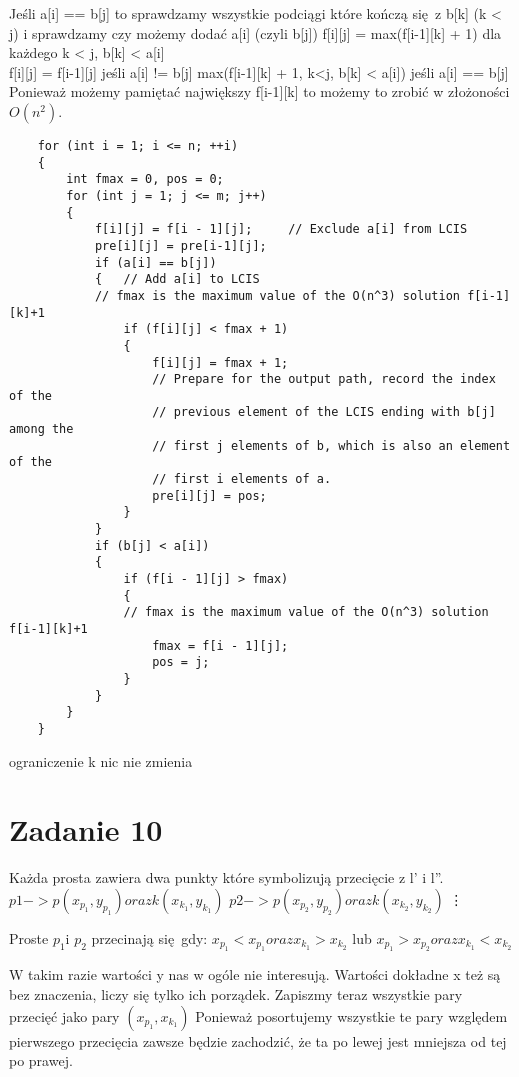 \documentclass[12pt]{article}
\begin{document}
Jeśli a[i] == b[j] to sprawdzamy wszystkie podciągi które kończą się z b[k] (k < j) i sprawdzamy czy możemy dodać a[i] (czyli b[j])
f[i][j] = max(f[i-1][k] + 1) dla każdego k < j, b[k] < a[i]\\


f[i][j] = f[i-1][j] jeśli a[i] != b[j]
max(f[i-1][k] + 1, k<j, b[k] < a[i]) jeśli a[i] == b[j]\\

Ponieważ możemy pamiętać największy f[i-1][k] to możemy to zrobić w złożoności $O(n^2)$.\\

\begin{lstlisting}
    for (int i = 1; i <= n; ++i)
    {
        int fmax = 0, pos = 0;
        for (int j = 1; j <= m; j++)
        {
            f[i][j] = f[i - 1][j];     // Exclude a[i] from LCIS
            pre[i][j] = pre[i-1][j];
            if (a[i] == b[j])
            {   // Add a[i] to LCIS
            // fmax is the maximum value of the O(n^3) solution f[i-1][k]+1
                if (f[i][j] < fmax + 1) 
                {
                    f[i][j] = fmax + 1;
                    // Prepare for the output path, record the index of the 
                    // previous element of the LCIS ending with b[j] among the
                    // first j elements of b, which is also an element of the 
                    // first i elements of a.
                    pre[i][j] = pos;  
                }
            }
            if (b[j] < a[i])
            {
                if (f[i - 1][j] > fmax)
                {
                // fmax is the maximum value of the O(n^3) solution f[i-1][k]+1
                    fmax = f[i - 1][j]; 
                    pos = j;
                }
            }
        }
    }
\end{lstlisting}

ograniczenie k nic nie zmienia

\section{Zadanie 10}

Każda prosta zawiera dwa punkty które symbolizują przecięcie z l' i l''.
$p1 -> p(x_{p_1}, y_{p_1}) oraz k(x_{k_1}, y_{k_1})$
$p2 -> p(x_{p_2}, y_{p_2}) oraz k(x_{k_2}, y_{k_2})$
\vdots

Proste $p_1 $i $p_2$ przecinają się gdy:
$x_{p_1} < x_{p_1} oraz x_{k_1} > x_{k_2}$
lub 
$x_{p_1} > x_{p_2} oraz x_{k_1} < x_{k_2}$

W takim razie wartości y nas w ogóle nie interesują. 
Wartości dokładne x też są bez znaczenia, liczy się tylko ich porządek. 
Zapiszmy teraz wszystkie pary przecięć jako pary $(x_{p_1}, x_{k_1}) $
Ponieważ posortujemy wszystkie te pary względem pierwszego przecięcia zawsze będzie zachodzić, że ta po lewej jest mniejsza od tej po prawej. 
\end{document}
